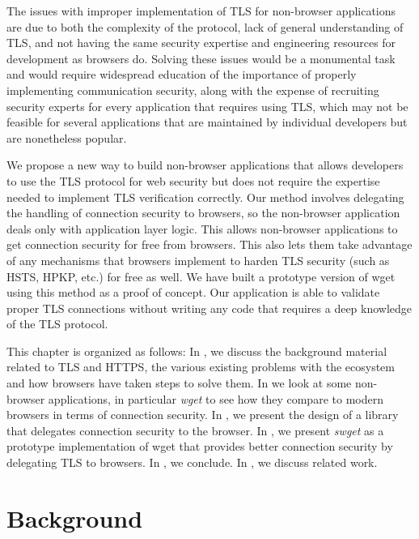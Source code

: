 The issues with improper implementation of TLS for non-browser applications are
due to both the complexity of the protocol, lack of general understanding of
TLS, and not having the same security expertise and engineering resources for
development as browsers do. Solving these issues would be a monumental task and
would require widespread education of the importance of properly implementing
communication security, along with the expense of recruiting security experts
for every application that requires using TLS, which may not be feasible for
several applications that are maintained by individual developers but are
nonetheless popular.

We propose a new way to build non-browser applications that allows developers
to use the TLS protocol for web security but does not require the expertise
needed to implement TLS verification correctly. Our method involves delegating
the handling of connection security to browsers, so the non-browser application
deals only with application layer logic. This allows non-browser applications
to get connection security for free from browsers. This also lets them take
advantage of any mechanisms that browsers implement to harden TLS security
(such as HSTS, HPKP, etc.) for free as well. We have built a prototype version
of wget using this method as a proof of concept. Our application is able to
validate proper TLS connections without writing any code that requires a deep
knowledge of the TLS protocol.

This chapter is organized as follows: In , we
discuss the background material related to TLS and HTTPS, the various existing problems
with the ecosystem and how browsers have taken steps to solve them. In
 we look at some non-browser applications, in particular
\emph{wget} to see how they compare to modern browsers in terms of connection security.
In , we present the design of a library that delegates
connection security to the browser. In , we present \emph{swget} as
a prototype implementation of wget that provides better connection security by delegating
TLS to browsers. In , we conclude. In ,
we discuss related work.


\section{Background}
\label{sec:background-saber}



